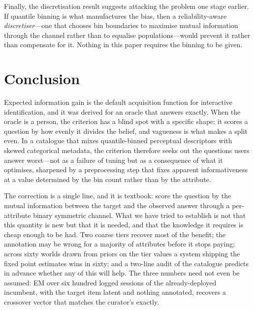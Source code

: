 Finally, the discretisation result suggests attacking the problem one stage
earlier. If quantile binning is what manufactures the bias, then a
reliability-aware \emph{discretiser}---one that chooses bin boundaries to
maximise mutual information through the channel rather than to equalise
populations---would prevent it rather than compensate for it. Nothing in this
paper requires the binning to be given.

\section{Conclusion}
\label{sec:conclusion}

Expected information gain is the default acquisition function for interactive
identification, and it was derived for an oracle that answers exactly. When the
oracle is a person, the criterion has a blind spot with a specific shape: it
scores a question by how evenly it divides the belief, and vagueness is what
makes a split even. In a catalogue that mixes quantile-binned perceptual
descriptors with skewed categorical metadata, the criterion therefore seeks out
the questions users answer worst---not as a failure of tuning but as a
consequence of what it optimises, sharpened by a preprocessing step that fixes
apparent informativeness at a value determined by the bin count rather than by
the attribute.

The correction is a single line, and it is textbook: score the question by the
mutual information between the target and the observed answer through a
per-attribute binary symmetric channel. What we have tried to establish is not
that this quantity is new but that it is needed, and that the knowledge it
requires is cheap enough to be had. Two coarse tiers recover most of the
benefit; the annotation may be wrong for a majority of attributes before it
stops paying; across sixty worlds drawn from priors on the tier values a system
shipping the fixed point estimates wins in sixty; and a two-line audit of the
catalogue predicts in advance whether any of this will help. The three numbers
need not even be assumed: EM over six hundred logged sessions of the
already-deployed incumbent, with the target item latent and nothing annotated,
recovers a crossover vector that matches the curator's exactly.

